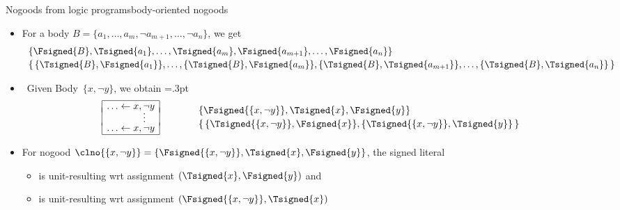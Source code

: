 \begin{frame}{Nogoods from logic programs}{body-oriented nogoods}
  \begin{itemize}
  \item <1> For a body $B=\{a_1,\dots,a_m,\neg a_{m+1},\dots,\neg a_n\}$, %
    we get
    \vspace{-2pt}
    \[
    \begin{array}{l}
      \{\Fsigned{B},\Tsigned{a_1},\dots,\Tsigned{a_m},\Fsigned{a_{m+1}},\dots,\Fsigned{a_n}\}
      \\[2pt]
      \{\,
      \{\Tsigned{B},\Fsigned{a_1}\},
      \dots,
      \{\Tsigned{B},\Fsigned{a_m}\},
      \{\Tsigned{B},\Tsigned{a_{m+1}}\},
      \dots,
      \{\Tsigned{B},\Tsigned{a_n}\}
      \,\}
    \end{array}
  \]
  \item<2->  \
    Given Body~$\{x,\neg y\}$, we obtain
    \arrayrulewidth=.3pt
    \[
    \begin{array}{@{}|r@{}l|}
      \hline
      \ldots\leftarrow{}&x,\neg y\\[-1.2ex]
      &\quad\vdots\\[-3pt]
      \ldots\leftarrow{}&x,\neg y\\
      \hline
    \end{array}
    \quad\quad
    \begin{array}{p{5pt}l}
      &\{\Fsigned{\{x,\neg y\}},\Tsigned{x},\Fsigned{y}\}
      \\[2pt]
      &\{\,\{\Tsigned{\{x,\neg y\}},\Fsigned{x}\},\{\Tsigned{\{x,\neg y\}},\Tsigned{y}\}\,\}
    \end{array}
    \]
  \item<3-> []
    For nogood $\clno{\{x,\neg y\}}=\{\Fsigned{\{x,\neg y\}},\Tsigned{x},\Fsigned{y}\}$,
    the signed literal
    \begin{itemize}
    \item {} is unit-resulting  wrt assignment $(\Tsigned{x},\Fsigned{y})$
      and
    \item {}                    is unit-resulting  wrt assignment $(\Fsigned{\{x,\neg y\}},\Tsigned{x})$
    \end{itemize}
  \end{itemize}
\end{frame}
